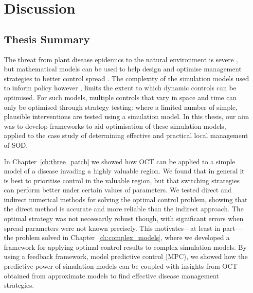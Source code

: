 %
\chapter{Discussion\label{ch:discussion}}

\section{Thesis Summary}

The threat from plant disease epidemics to the natural environment is severe \citep{freer_tree_2017}, but mathematical models can be used to help design and optimise management strategies to better control spread \citep{lofgren_opinion_2014,cunniffe_optimising_2015}. The complexity of the simulation models used to inform policy however \citep[e.g.][]{defra_chalara_2013}, limits the extent to which dynamic controls can be optimised. For such models, multiple controls that vary in space and time can only be optimised through strategy testing: where a limited number of simple, plausible interventions are tested using a simulation model. In this thesis, our aim was to develop frameworks to aid optimisation of these simulation models, applied to the case study of determining effective and practical local management of SOD.

In Chapter~\ref{ch:three_patch} we showed how OCT can be applied to a simple model of a disease invading a highly valuable region. We found that in general it is best to prioritise control in the valuable region, but that switching strategies can perform better under certain values of parameters. We tested direct and indirect numerical methods for solving the optimal control problem, showing that the direct method is accurate and more reliable than the indirect approach. The optimal strategy was not necessarily robust though, with significant errors when spread parameters were not known precisely. This motivates---at least in part---the problem solved in Chapter~\ref{ch:complex_models}, where we developed a framework for applying optimal control results to complex simulation models. By using a feedback framework, model predictive control (MPC), we showed how the predictive power of simulation models can be coupled with insights from OCT obtained from approximate models to find effective disease management strategies.

